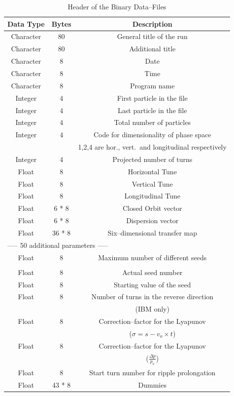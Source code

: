 \documentclass[a4paper,11pt]{report}
\begin{document}
\begin{table}[h]
\caption{Header of the Binary Data--Files}
\label{T-HDF}
\centering
\begin{tabular}{|c|c|c|}
  \hline
  {\bf Data Type} & {\bf Bytes} & {\bf Description} \\
  \hline
  Character & 80 & General title of the run \\
  \hline
  Character & 80 & Additional title \\
  \hline
  Character & 8 & Date \\
  \hline
  Character & 8 & Time \\
  \hline
  Character & 8 & Program name \\
  \hline
  Integer & 4 & First particle in the file \\
  \hline
  Integer & 4 & Last particle in the file \\
  \hline
  Integer & 4 & Total number of particles \\
  \hline
  Integer & 4 & Code for dimensionality of phase space \\
  & & 1,2,4 are hor., vert.\ and longitudinal respectively \\
  \hline
  Integer & 4 & Projected number of turns \\
  \hline
  Float & 8 & Horizontal Tune \\
  \hline
  Float & 8 & Vertical Tune \\
  \hline
  Float & 8 & Longitudinal Tune \\
  \hline
  Float & 6 * 8 & Closed Orbit vector \\
  \hline
  Float & 6 * 8 & Dispersion vector \\
  \hline
  Float & 36 * 8 & Six--dimensional transfer map \\
  \hline
  \multicolumn{3}{|l|}{----- 50 additional parameters -----} \\
  \hline
  Float & 8 & Maximum number of different seeds \\
  & & \\
  \hline
  Float & 8 & Actual seed number \\
  \hline
  Float & 8 & Starting value of the seed \\
  \hline
  Float & 8 & Number of turns in the reverse direction \\
  & & (IBM only) \\
  \hline
  Float & 8 & Correction--factor for the Lyapunov \\
  & & ($\sigma = s - v_o \times t$) \\
  \hline
  Float & 8 & Correction--factor for the Lyapunov \\
  & & (\mbox{$ \frac{\Delta p}{p_o} $}) \\
  \hline
  Float & 8 & Start turn number for ripple prolongation \\
  \hline
  Float & 43 * 8 & Dummies \\
  \hline
\end{tabular}
\end{table}
\end{document}
